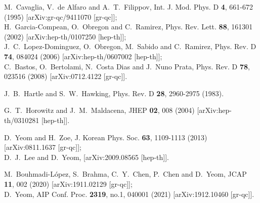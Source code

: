 \documentclass{andromedaone}
\begin{document}
\begin{thebibliography}{99}
M.~Cavaglia, V.~de Alfaro and A.~T.~Filippov,
Int. J. Mod. Phys. D \textbf{4}, 661-672 (1995)
[arXiv:gr-qc/9411070 [gr-qc]];\\
H.~Garcia-Compean, O.~Obregon and C.~Ramirez,
Phys. Rev. Lett. \textbf{88}, 161301 (2002)
[arXiv:hep-th/0107250 [hep-th]];\\
J.~C.~Lopez-Dominguez, O.~Obregon, M.~Sabido and C.~Ramirez,
Phys. Rev. D \textbf{74}, 084024 (2006)
[arXiv:hep-th/0607002 [hep-th]];\\
C.~Bastos, O.~Bertolami, N.~Costa Dias and J.~Nuno Prata,
Phys. Rev. D \textbf{78}, 023516 (2008)
[arXiv:0712.4122 [gr-qc]].

J.~B.~Hartle and S.~W.~Hawking,
Phys. Rev. D \textbf{28}, 2960-2975 (1983).

G.~T.~Horowitz and J.~M.~Maldacena,
JHEP \textbf{02}, 008 (2004)
[arXiv:hep-th/0310281 [hep-th]].

D.~Yeom and H.~Zoe,
J. Korean Phys. Soc. \textbf{63}, 1109-1113 (2013)
[arXiv:0811.1637 [gr-qc]];\\
D.~J.~Lee and D.~Yeom,
[arXiv:2009.08565 [hep-th]].


M.~Bouhmadi-L\'opez, S.~Brahma, C.~Y.~Chen, P.~Chen and D.~Yeom,
JCAP \textbf{11}, 002 (2020)
[arXiv:1911.02129 [gr-qc]];\\
D.~Yeom,
AIP Conf. Proc. \textbf{2319}, no.1, 040001 (2021)
[arXiv:1912.10460 [gr-qc]].


\end{thebibliography}
\end{document}
